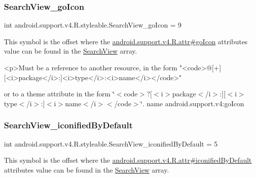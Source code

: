 \subsubsection{\texorpdfstring{Search\+View\+\_\+go\+Icon}{SearchView\_goIcon}}
{\footnotesize\ttfamily int android.\+support.\+v4.\+R.\+styleable.\+Search\+View\+\_\+go\+Icon = 9\hspace{0.3cm}{\ttfamily [static]}}

This symbol is the offset where the \hyperlink{classandroid_1_1support_1_1v4_1_1R_1_1attr_ad09751f3e3e8e8f66d33642b913bc660}{android.\+support.\+v4.\+R.\+attr\#go\+Icon} attribute\textquotesingle{}s value can be found in the \hyperlink{classandroid_1_1support_1_1v4_1_1R_1_1styleable_a7f709410d566e9fd5d4c710e815c300a}{Search\+View} array.

\begin{DoxyVerb}      <p>Must be a reference to another resource, in the form "<code>@[+][<i>package</i>:]<i>type</i>:<i>name</i></code>"
\end{DoxyVerb}
 or to a theme attribute in the form \char`\"{}$<$code$>$?\mbox{[}$<$i$>$package$<$/i$>$\+:\mbox{]}\mbox{[}$<$i$>$type$<$/i$>$\+:\mbox{]}$<$i$>$name$<$/i$>$$<$/code$>$\char`\"{}.  name android.\+support.\+v4\+:go\+Icon \mbox{\label{classandroid_1_1support_1_1v4_1_1R_1_1styleable_a417d0b0a020ec93e98525e018b21b07a}} 
\subsubsection{\texorpdfstring{Search\+View\+\_\+iconified\+By\+Default}{SearchView\_iconifiedByDefault}}
{\footnotesize\ttfamily int android.\+support.\+v4.\+R.\+styleable.\+Search\+View\+\_\+iconified\+By\+Default = 5\hspace{0.3cm}{\ttfamily [static]}}

This symbol is the offset where the \hyperlink{classandroid_1_1support_1_1v4_1_1R_1_1attr_aa9f1d1d1b5e0a8ba7afe8a2eaecd953f}{android.\+support.\+v4.\+R.\+attr\#iconified\+By\+Default} attribute\textquotesingle{}s value can be found in the \hyperlink{classandroid_1_1support_1_1v4_1_1R_1_1styleable_a7f709410d566e9fd5d4c710e815c300a}{Search\+View} array.

